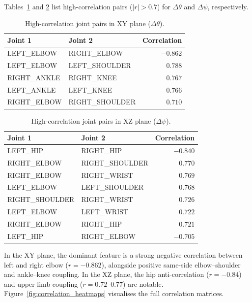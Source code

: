 \documentclass[twocolumn]{article}
\begin{document}
Tables~\ref{tab:correlation_theta} and \ref{tab:correlation_psi} list
high-correlation pairs ($|r|>0.7$) for $\Delta\theta$ and $\Delta\psi$,
respectively.

\begin{table}[!t]
\centering
\caption{High-correlation joint pairs in XY plane ($\Delta\theta$).}
\label{tab:correlation_theta}
\small
\begin{tabular}{llr}
\toprule
Joint 1        & Joint 2        & Correlation \\
\midrule
LEFT\_ELBOW    & RIGHT\_ELBOW   & $-0.862$ \\
LEFT\_ELBOW    & LEFT\_SHOULDER &  $0.788$ \\
RIGHT\_ANKLE   & RIGHT\_KNEE    &  $0.767$ \\
LEFT\_ANKLE    & LEFT\_KNEE     &  $0.766$ \\
RIGHT\_ELBOW   & RIGHT\_SHOULDER&  $0.710$ \\
\bottomrule
\end{tabular}
\end{table}

\begin{table}[!t]
\centering
\caption{High-correlation joint pairs in XZ plane ($\Delta\psi$).}
\label{tab:correlation_psi}
\small
\begin{tabular}{llr}
\toprule
Joint 1        & Joint 2         & Correlation \\
\midrule
LEFT\_HIP      & RIGHT\_HIP      & $-0.840$ \\
RIGHT\_ELBOW   & RIGHT\_SHOULDER &  $0.770$ \\
RIGHT\_ELBOW   & RIGHT\_WRIST    &  $0.769$ \\
LEFT\_ELBOW    & LEFT\_SHOULDER  &  $0.768$ \\
RIGHT\_SHOULDER& RIGHT\_WRIST    &  $0.726$ \\
LEFT\_ELBOW    & LEFT\_WRIST     &  $0.722$ \\
RIGHT\_ELBOW   & RIGHT\_HIP      &  $0.721$ \\
LEFT\_HIP      & RIGHT\_ELBOW    & $-0.705$ \\
\bottomrule
\end{tabular}
\end{table}

In the XY plane, the dominant feature is a strong negative correlation
between left and right elbow ($r=-0.862$), alongside positive same-side
elbow–shoulder and ankle–knee coupling. In the XZ plane, the hip
anti-correlation ($r=-0.84$) and upper-limb coupling ($r=0.72$–$0.77$) are
notable. Figure~\ref{fig:correlation_heatmaps} visualises the full
correlation matrices.
\end{document}
